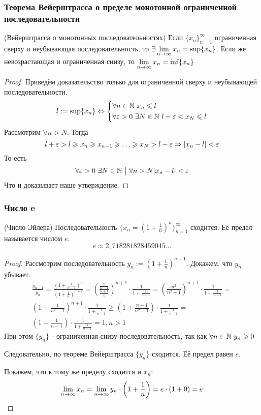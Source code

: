 \subsubsection{Теорема Вейерштрасса о пределе монотонной ограниченной последовательности}
\begin{theorem} (Вейерштрасса о монотонных последовательностях)
	Если $\{x_n\}_{n = 1}^\infty$ ограниченная сверху и неубывающая последовательность, то $\exists \lim\limits_{n \rightarrow \infty} x_n = \sup \{x_n\}$. Если же невозрастающая и ограниченная снизу, то $\lim\limits_{n \rightarrow \infty} x_n = \inf \{x_n\}$
\end{theorem}

\begin{proof}
	Приведём доказательство только для ограниченной сверху и неубывающей последовательности.
	\[
		l := \sup \{x_n\} \Leftrightarrow \left\{\begin{aligned}
		&\forall n \in \mathbb{N}\ x_n \leqslant l
		\\
		&\forall \varepsilon > 0\ \exists N \in \mathbb{N}\ l - \varepsilon < x_N \leqslant l
		\end{aligned}\right.
	\]
	Рассмотрим $\forall n > N$. Тогда
	\[
		l + \eps > l \ge x_n \ge x_{n - 1} \ge \dots \ge x_N > l - \eps \Ra |x_n - l| < \eps
	\]
	То есть
	\[
		\forall \varepsilon > 0\ \exists N \in \mathbb{N} \ \big|\  \forall n > N |x_n - l| < \varepsilon
	\]
	Что и доказывает наше утверждение.
\end{proof}

\subsubsection{Число e}
\begin{theorem} (Число Эйлера)
	Последовательность $\{x_n = \left(1 + \frac{1}{n}\right)^n\}_{n = 1}^\infty$ сходится. Её предел называется числом $e$.
	$$
		e \approx 2,718281828459045\dots
	$$
\end{theorem}

\begin{proof}
	Рассмотрим последовательность $y_n := \left(1 + \frac{1}{n}\right)^{n + 1}$. Докажем, что $y_n$ убывает.
	\begin{multline*}
		\frac{y_{n - 1}}{y_n} = \frac{(1 + \frac{1}{n - 1})^n}{(1 + \frac{1}{n})^{n + 1}} = \left(\frac{\frac{n}{n - 1}}{\frac{n + 1}{n}}\right)^{n+1} \cdot \frac{1}{1 + \frac{1}{n - 1}} = \left(\frac{n^2}{n^2 - 1}\right)^{n+1} \cdot \frac{1}{1 + \frac{1}{n - 1}} = \\
		\left(1 + \frac{1}{n^2 - 1}\right)^{n+1} \cdot \frac{1}{1 + \frac{1}{n - 1}} \ge \left(1 + \frac{n + 1}{n^2 - 1}\right) \cdot \frac{1}{1 + \frac{1}{n - 1}} = \\
		\left(1 + \frac{1}{n - 1}\right) \cdot \frac{1}{1 + \frac{1}{n - 1}} = 1, n > 1
	\end{multline*}
	При этом $\{y_n\}$ - ограниченная снизу последовательность, так как $\forall n \in \mathbb{N}\ y_n \geqslant 0$
	
	Следовательно, по теореме Вейерштрасса $\{y_n\}$ сходится. Её предел равен $e$.
	
	Покажем, что к тому же пределу сходится и $x_n$:
	$$
		\lim\limits_{n \to \infty} x_n = \lim\limits_{n \to \infty} y_n \cdot \left(1 + \frac{1}{n}\right) = e \cdot (1 + 0) = e
	$$
\end{proof}
